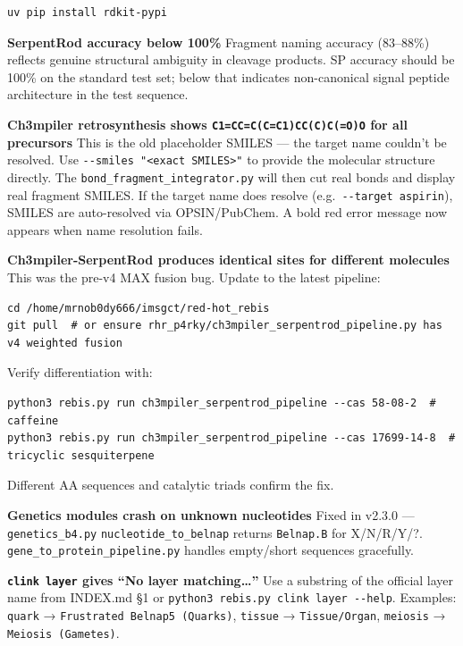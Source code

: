\begin{verbatim}
uv pip install rdkit-pypi
\end{verbatim}

\textbf{SerpentRod accuracy below 100\%} Fragment naming accuracy
(83--88\%) reflects genuine structural ambiguity in cleavage products.
SP accuracy should be 100\% on the standard test set; below that
indicates non-canonical signal peptide architecture in the test
sequence.

\textbf{Ch3mpiler retrosynthesis shows \texttt{C1=CC=C(C=C1)CC(C)C(=O)O}
for all precursors} This is the old placeholder SMILES --- the target
name couldn't be resolved. Use
\texttt{-\/-smiles\ "\textless{}exact\ SMILES\textgreater{}"} to provide
the molecular structure directly. The
\texttt{bond\_fragment\_integrator.py} will then cut real bonds and
display real fragment SMILES. If the target name does resolve
(e.g.~\texttt{-\/-target\ aspirin}), SMILES are auto-resolved via
OPSIN/PubChem. A bold red error message now appears when name resolution
fails.

\textbf{Ch3mpiler-SerpentRod produces identical sites for different
molecules} This was the pre-v4 MAX fusion bug. Update to the latest
pipeline:

\begin{verbatim}
cd /home/mrnob0dy666/imsgct/red-hot_rebis
git pull  # or ensure rhr_p4rky/ch3mpiler_serpentrod_pipeline.py has v4 weighted fusion
\end{verbatim}

Verify differentiation with:

\begin{verbatim}
python3 rebis.py run ch3mpiler_serpentrod_pipeline --cas 58-08-2  # caffeine
python3 rebis.py run ch3mpiler_serpentrod_pipeline --cas 17699-14-8  # tricyclic sesquiterpene
\end{verbatim}

Different AA sequences and catalytic triads confirm the fix.

\textbf{Genetics modules crash on unknown nucleotides} Fixed in v2.3.0
--- \texttt{genetics\_b4.py} \texttt{nucleotide\_to\_belnap} returns
\texttt{Belnap.B} for X/N/R/Y/?. \texttt{gene\_to\_protein\_pipeline.py}
handles empty/short sequences gracefully.

\textbf{\texttt{clink\ layer} gives ``No layer matching\ldots{}''} Use a
substring of the official layer name from INDEX.md §1 or
\texttt{python3\ rebis.py\ clink\ layer\ -\/-help}. Examples:
\texttt{quark} → \texttt{Frustrated\ Belnap5\ (Quarks)}, \texttt{tissue}
→ \texttt{Tissue/Organ}, \texttt{meiosis} → \texttt{Meiosis\ (Gametes)}.

